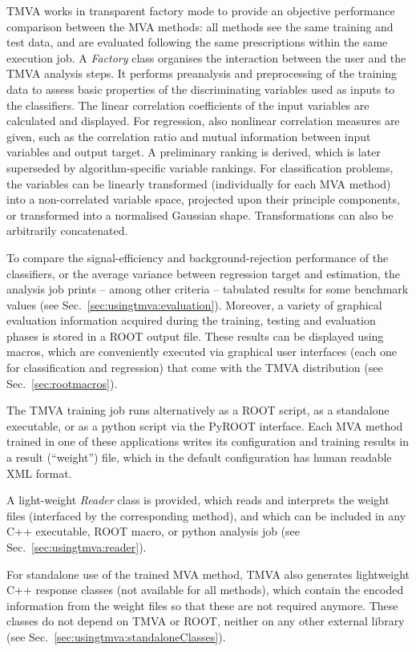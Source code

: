 TMVA works in transparent factory mode to provide an objective performance comparison 
between the MVA methods: all methods see the same training and test data, and are 
evaluated following the same prescriptions within the same execution job. A {\em Factory} 
class organises the interaction between the user and the TMVA analysis steps. It performs 
preanalysis and preprocessing of the training data to assess basic properties of the 
discriminating variables used as inputs to the classifiers. The linear correlation 
coefficients of the input variables are calculated and displayed. For regression, also 
nonlinear correlation measures are given, such as the correlation ratio and mutual 
information between input variables and output target. A preliminary 
ranking is derived, which is later superseded by algorithm-specific variable rankings. 
For classification problems, the variables can be linearly transformed (individually 
for each MVA method) into a non-correlated variable space, projected upon their principle 
components, or transformed into a normalised Gaussian shape. Transformations can also 
be arbitrarily concatenated.

To compare the signal-efficiency and background-rejection performance of the classifiers, 
or the average variance between regression target and estimation, the analysis job prints --
among other criteria -- tabulated results for some benchmark values (see 
Sec.~\ref{sec:usingtmva:evaluation}). Moreover, a variety of graphical evaluation information
acquired during the training, testing and evaluation phases is stored in a ROOT output 
file. These results can be displayed using macros, which are conveniently executed 
via graphical user interfaces (each one for classification and regression) 
that come with the TMVA distribution (see Sec.~\ref{sec:rootmacros}).

The TMVA training job runs alternatively as a ROOT script, as a standalone executable, or 
as a python script via the PyROOT interface. Each MVA method trained in one of these 
applications writes its configuration and training results in a result (``weight'') file, 
which in the default configuration has human readable XML format.

A light-weight {\em Reader} class is provided, which reads and interprets the 
weight files (interfaced by the corresponding method), and which can 
be included in any C++ executable, ROOT macro, or python analysis job
(see Sec.~\ref{sec:usingtmva:reader}).

For standalone use of the trained MVA method, TMVA also generates lightweight C++ response 
classes (not available for all methods), which contain the encoded information from the 
weight files so that these are not required anymore. These classes do not depend on TMVA 
or ROOT, neither on any other external library (see Sec.~\ref{sec:usingtmva:standaloneClasses}).

